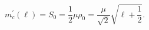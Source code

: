 \begin{equation}                              
m_{c}^{'}(\ell)=S_{0} = \frac{1}{2} \mu \rho_{0} =                               
\frac{\mu}{\sqrt{2}} \sqrt{\ell + \frac{1}{2}}.                    \label{eq:mca}          
\end{equation} 
